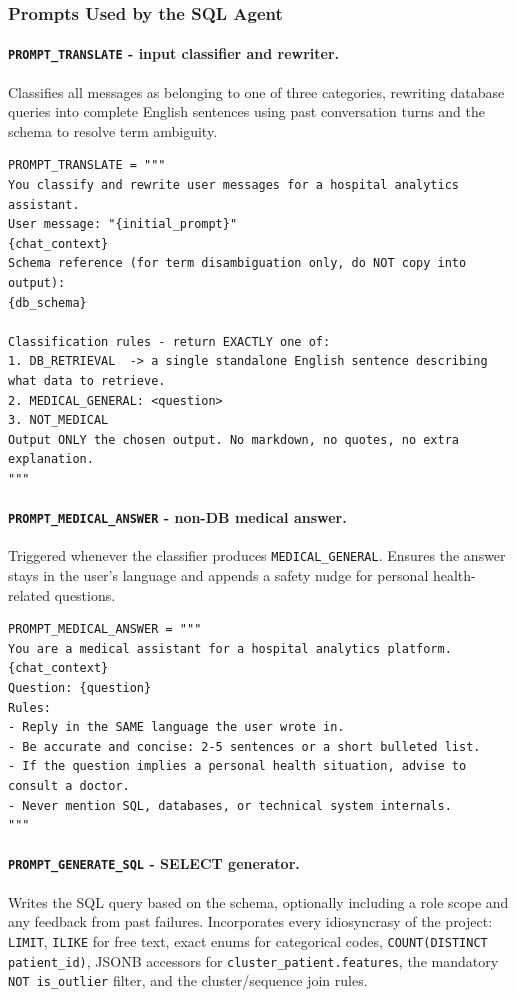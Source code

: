 \subsubsection*{Prompts Used by the SQL Agent}

\paragraph{\texttt{PROMPT\_TRANSLATE} - input classifier and rewriter.} Classifies all messages as belonging to one of three categories, rewriting database queries into complete English sentences using past conversation turns and the schema to resolve term ambiguity.

\begin{lstlisting}[style=pythonstyle]
PROMPT_TRANSLATE = """
You classify and rewrite user messages for a hospital analytics assistant.
User message: "{initial_prompt}"
{chat_context}
Schema reference (for term disambiguation only, do NOT copy into output):
{db_schema}

Classification rules - return EXACTLY one of:
1. DB_RETRIEVAL  -> a single standalone English sentence describing what data to retrieve.
2. MEDICAL_GENERAL: <question>
3. NOT_MEDICAL
Output ONLY the chosen output. No markdown, no quotes, no extra explanation.
"""
\end{lstlisting}

\paragraph{\texttt{PROMPT\_\allowbreak MEDICAL\_\allowbreak ANSWER} - non-DB medical answer.} Triggered whenever the classifier produces \texttt{MEDICAL\_\allowbreak GENERAL}. Ensures the answer stays in the user's language and appends a safety nudge for personal health-related questions.

\begin{lstlisting}[style=pythonstyle]
PROMPT_MEDICAL_ANSWER = """
You are a medical assistant for a hospital analytics platform.
{chat_context}
Question: {question}
Rules:
- Reply in the SAME language the user wrote in.
- Be accurate and concise: 2-5 sentences or a short bulleted list.
- If the question implies a personal health situation, advise to consult a doctor.
- Never mention SQL, databases, or technical system internals.
"""
\end{lstlisting}

\paragraph{\texttt{PROMPT\_\allowbreak GENERATE\_\allowbreak SQL} - SELECT generator.} Writes the SQL query based on the schema, optionally including a role scope and any feedback from past failures. Incorporates every idiosyncrasy of the project: \texttt{LIMIT}, \texttt{ILIKE} for free text, exact enums for categorical codes, \texttt{COUNT(DISTINCT patient\_id)}, JSONB accessors for \texttt{cluster\_patient.features}, the mandatory \texttt{NOT is\_outlier} filter, and the cluster/sequence join rules.

